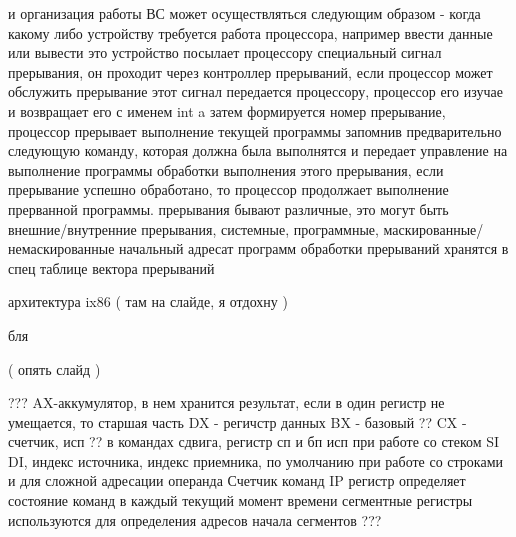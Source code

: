 и организация работы ВС может осуществляться следующим образом - 
когда какому либо устройству требуется работа процессора, например ввести данные или вывести
это устройство посылает процессору специальный сигнал прерывания, он проходит через контроллер прерываний, если процессор может обслужить прерывание
этот сигнал передается процессору, процессор его изучае и возвращает его с именем int a затем формируется номер прерывание, процессор прерывает выполнение текущей программы
запомнив предварительно следующую команду, которая должна была выполнятся и передает управление на выполнение программы обработки выполнения этого прерывания,
если прерывание успешно обработано, то процессор продолжает выполнение прерванной программы.
прерывания бывают различные, это могут быть внешние/внутренние прерывания, системные, программные, маскированные/немаскированные
начальный адресат программ обработки прерываний хранятся в спец таблице вектора прерываний

архитектура ix86 ( там на слайде, я отдохну )

бля

( опять слайд )

???
AX-аккумулятор, в нем хранится результат, если в один регистр не умещается, то старшая часть DX - регичстр данных
BX - базовый ?? CX - счетчик, исп ?? в командах сдвига, регистр сп и бп исп при работе со стеком
SI DI, индекс источника, индекс приемника, по умолчанию при работе со строками и для сложной адресации операнда
Счетчик команд IP
регистр определяет состояние команд в каждый текущий момент времени
сегментные регистры используются для определения адресов начала сегментов
???